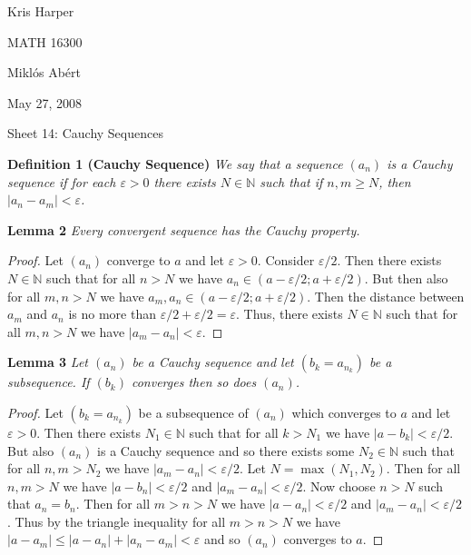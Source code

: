 \documentclass{article}
\begin{document}
\begin{flushright}
Kris Harper

MATH 16300

Mikl\'{o}s Ab\'{e}rt

May 27, 2008
\end{flushright}

\begin{flushleft}

\Large

Sheet 14: Cauchy Sequences\newline

\normalsize

\textbf{Definition 1 (Cauchy Sequence)}
\textsl{We say that a sequence $(a_n)$ is a Cauchy sequence if for each $\varepsilon > 0$ there exists $N \in \mathbb{N}$ such that if $n,m \geq N$, then $|a_n-a_m| < \varepsilon$.}\newline

\textbf{Lemma 2}
\textsl{Every convergent sequence has the Cauchy property.}
\begin{proof}
Let $(a_n)$ converge to $a$ and let $\varepsilon > 0$. Consider $\varepsilon/2$. Then there exists $N \in \mathbb{N}$ such that for all $n>N$ we have $a_n \in (a - \varepsilon/2 ; a + \varepsilon/2)$. But then also for all $m,n > N$ we have $a_m, a_n \in (a - \varepsilon/2 ; a + \varepsilon/2)$. Then the distance between $a_m$ and $a_n$ is no more than $\varepsilon / 2 + \varepsilon /2 = \varepsilon$. Thus, there exists $N \in \mathbb{N}$ such that for all $m,n > N$ we have $|a_m-a_n| < \varepsilon$.
\end{proof}

\textbf{Lemma 3}
\textsl{Let $(a_n)$ be a Cauchy sequence and let $(b_k = a_{n_k})$ be a subsequence. If $(b_k)$ converges then so does $(a_n)$.}
\begin{proof}
Let $(b_k = a_{n_k})$ be a subsequence of $(a_n)$ which converges to $a$ and let $\varepsilon > 0$. Then there exists $N_1 \in \mathbb{N}$ such that for all $k > N_1$ we have $|a-b_k| < \varepsilon/2$. But also $(a_n)$ is a Cauchy sequence and so there exists some $N_2 \in \mathbb{N}$ such that for all $n,m > N_2$ we have $|a_m - a_n| < \varepsilon/2$. Let $N = \max (N_1,N_2)$. Then for all $n,m > N$ we have $|a-b_n| < \varepsilon/2$ and $|a_m - a_n| < \varepsilon/2$. Now choose $n>N$ such that $a_n = b_n$. Then for all $m > n > N$ we have $|a-a_n| < \varepsilon/2$ and $|a_m - a_n| < \varepsilon/2$. Thus by the triangle inequality for all $m>n>N$ we have $|a - a_m| \leq |a - a_n| + |a_n - a_m| < \varepsilon$ and so $(a_n)$ converges to $a$.
\end{proof}


\end{flushleft}
\end{document}
